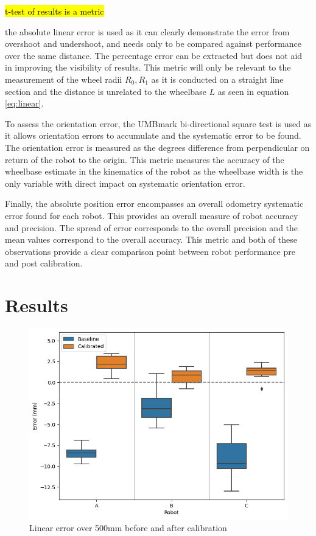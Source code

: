 \documentclass[conference]{IEEEtran}
\begin{document}
\hl{t-test of results is a metric}

the absolute linear error is used as it can clearly demonstrate the error from overshoot and undershoot, and needs only to be compared against performance over the same distance. The percentage error can be extracted but does not aid in improving the visibility of results. This metric will only be relevant to the measurement of the wheel radii $R_0, R_1$ as it is conducted on a straight line section and the distance is unrelated to the wheelbase $L$ as seen in equation \ref{eq:linear}.

To assess the orientation error, the UMBmark bi-directional square test is used as it allows orientation errors to accumulate and the systematic error to be found. The orientation error is measured as the degrees difference from perpendicular on return of the robot to the origin. This metric measures the accuracy of the wheelbase estimate in the kinematics of the robot as the wheelbase width is the only variable with direct impact on systematic orientation error.

Finally, the absolute position error encompasses an overall odometry systematic error found for each robot. This provides an overall measure of robot accuracy and precision. The spread of error corresponds to the overall precision and the mean values correspond to the overall accuracy. This metric and both of these observations provide a clear comparison point between robot performance pre and post calibration.



\section{Results}\label{sec:results}

\begin{figure}[]
    \centering
    \includegraphics[width=.45\textwidth]{img/linear_pre_post.png}
    \caption{Linear error over 500mm before and after calibration}
    \label{fig:linear}
\end{figure}
\end{document}
